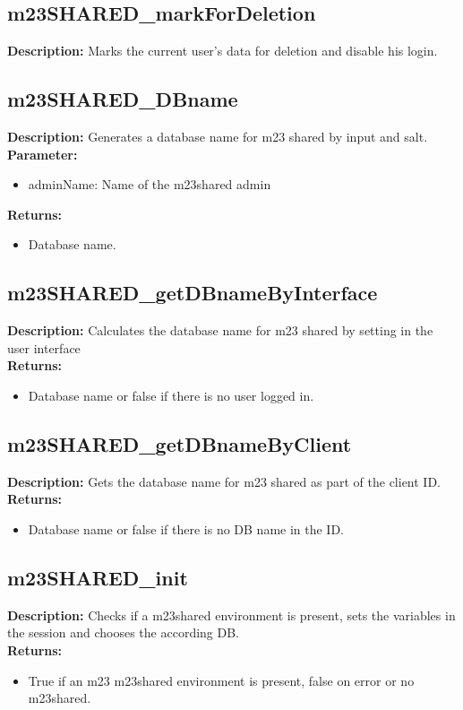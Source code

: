 \subsection{m23SHARED\_markForDeletion}
\textbf{Description:} Marks the current user's data for deletion and disable his login.\\

\subsection{m23SHARED\_DBname}
\textbf{Description:} Generates a database name for m23 shared by input and salt.\\
\textbf{Parameter:}
\begin{itemize}
\item adminName: Name of the m23shared admin
\end{itemize}
\textbf{Returns:}
\begin{itemize}
\item Database name.
\end{itemize}

\subsection{m23SHARED\_getDBnameByInterface}
\textbf{Description:} Calculates the database name for m23 shared by setting in the user interface\\
\textbf{Returns:}
\begin{itemize}
\item Database name or false if there is no user logged in.
\end{itemize}

\subsection{m23SHARED\_getDBnameByClient}
\textbf{Description:} Gets the database name for m23 shared as part of the client ID.\\
\textbf{Returns:}
\begin{itemize}
\item Database name or false if there is no DB name in the ID.
\end{itemize}

\subsection{m23SHARED\_init}
\textbf{Description:} Checks if a m23shared environment is present, sets the variables in the session and chooses the according DB.\\
\textbf{Returns:}
\begin{itemize}
\item True if an m23 m23shared environment is present, false on error or no m23shared.
\end{itemize}

